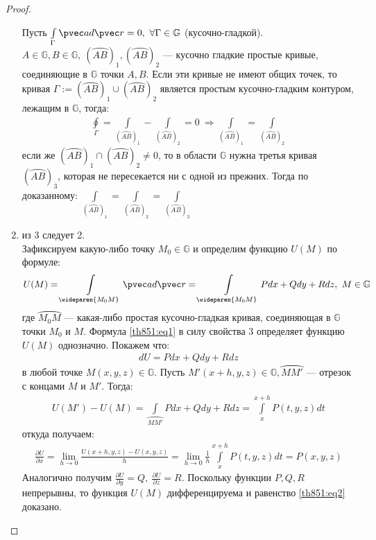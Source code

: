 \begin{proof}
\begin{enumerate}
      Пусть $\int\limits_{\Gamma} \pvec a d \pvec r = 0, \ \forall \Gamma \in
      \mathbb{G}$ (кусочно-гладкой). $A \in \mathbb{G}, B \in \mathbb{G}, \
      (\wideparen{AB})_1, (\wideparen{AB})_2$ --- кусочно гладкие простые
      кривые, соединяющие в $\mathbb{G}$ точки $A, B$. Если эти кривые не имеют
      общих точек, то кривая $\Gamma := (\wideparen{AB})_1 \cup
      (\wideparen{AB})_2$ является простым кусочно-гладким контуром, лежащим в
      $\mathbb{G}$, тогда:
      \begin{gather*}
        \oint\limits_{\Gamma} = \int\limits_{(\wideparen{AB})_1} -
        \int\limits_{(\wideparen{AB})_2} = 0 \ \Longrightarrow
        \int\limits_{(\wideparen{AB})_1} = \int\limits_{(\wideparen{AB})_2}
      \end{gather*}
      если же $(\wideparen{AB})_1 \cap (\wideparen{AB})_2 \not = 0$, то в
      области $\mathbb{G}$ нужна третья кривая $(\wideparen{AB})_3$, которая не
      пересекается ни с одной из прежних. Тогда по доказанному:
      $\int\limits_{(\wideparen{AB})_1} = \int\limits_{(\wideparen{AB})_2} =
      \int\limits_{(\wideparen{AB})_3}$
    \item из 3 следует 2. \\

      Зафиксируем какую-либо точку $M_0 \in \mathbb{G}$ и определим функцию
      $U(M)$ по формуле:
      \begin{gather}
        U(M) = \int\limits_{\wideparen{M_0M}} \pvec a d \pvec r =
        \int\limits_{\wideparen{M_0M}} Pdx + Qdy + Rdz, \ M \in \mathbb{G}
        \label{th851:eq1}
      \end{gather}
      где $\wideparen{M_0M}$ --- какая-либо простая кусочно-гладкая кривая,
      соединяющая в $\mathbb{G}$ точки $M_0$ и $M$. Формула \eqref{th851:eq1} в
      силу свойства 3 определяет функцию $U(M)$ однозначно. Покажем что:
      \begin{gather}
        dU = Pdx + Qdy + Rdz
        \label{th851:eq2}
      \end{gather}
      в любой точке $M(x, y, z) \in \mathbb{G}$. Пусть $M'(x + h, y, z) \in
      \mathbb{G}, \wideparen{MM'}$ --- отрезок с концами $M$ и $M'$. Тогда:
      \begin{gather*}
        U(M') - U(M) = \int\limits_{\wideparen{MM'}} Pdx + Qdy + Rdz =
        \int\limits_x^{x + h} P(t, y, z) dt
      \end{gather*}
      откуда получаем:
      \begin{gather*}
        \frac{\partial U}{\partial x} = \lim\limits_{h \to 0} \frac{U(x + h, y,
        z) - U(x, y, z)}{h} = \lim\limits_{h \to 0} \frac{1}{h}
        \int\limits_x^{x+h} P(t, y, z) dt = P(x, y, z)
      \end{gather*}
      Аналогично получим $\frac{\partial U}{\partial y} = Q, \ \frac{\partial
      U}{\partial z} = R$. Поскольку функции $P, Q, R$ непрерывны, то функция
      $U(M)$ дифференцируема и равенство \eqref{th851:eq2} доказано.
  \end{enumerate}
\end{proof}

